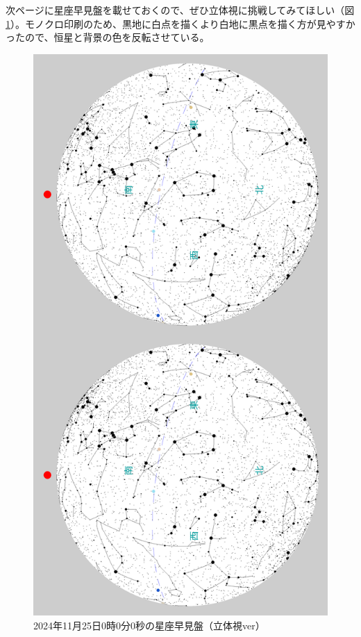 \documentclass[../main]{subfiles}
\begin{document}
次ページに星座早見盤を載せておくので、ぜひ立体視に挑戦してみてほしい（図\ref{fig:stereogram}）。モノクロ印刷のため、黒地に白点を描くより白地に黒点を描く方が見やすかったので、恒星と背景の色を反転させている。

\newpage
\begin{figure}[H]
  \centering
  \includegraphics[width=13cm]{sections/Fujisawa/image/CrossEyed_2024_11_25_0_0_0.png}
  \caption{2024年11月25日0時0分0秒の星座早見盤（立体視ver）}
  \label{fig:stereogram}
\end{figure}
\newpage
\end{document}

